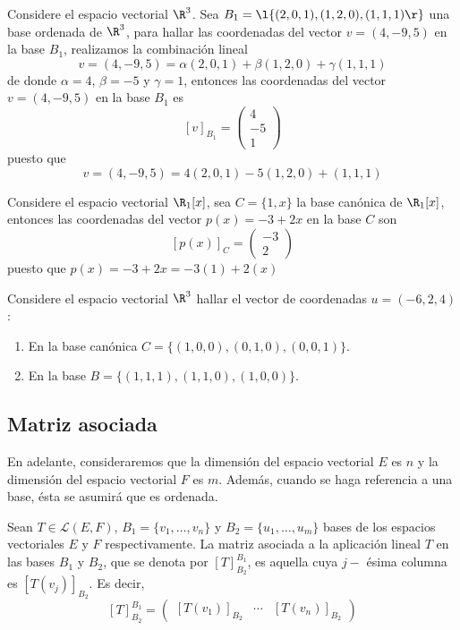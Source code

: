 \documentclass[compacto,10pt]{pubciencias-notas}
\begin{document}
\begin{ejem}\hspace{0pt}
Considere el espacio vectorial $\R^{3}$. Sea $B_{1} = \l\{(2,0,1), (1,2,0), (1,1,1)\r\}$ una base ordenada de $\R^{3}$, para hallar las coordenadas del vector $v=(4,-9,5)$ en la base $B_1$, realizamos la combinaci\'on lineal 
\[
v=(4,-9,5)=\alpha(2,0,1)+\beta(1,2,0)+\gamma(1,1,1)
\]
de donde $\alpha=4$, $\beta=-5$ y $\gamma=1$,
entonces las coordenadas del vector $v = (4,- 9,5)$ en la base $B_{1}$ es
    \[
        [v]_{B_{1}} = \begin{pmatrix}4\\-5\\1\end{pmatrix}
    \]
 puesto que    
\[
v=(4,-9,5)=4(2,0,1)-5(1,2,0)+(1,1,1)
\]
 \end{ejem}
\begin{ejem}
Considere el espacio vectorial $\R_1[x]$, sea $C=\{1,x\}$ la base can\'onica de $\R_1[x]$, entonces las coordenadas del vector $p(x)=-3+2x$ en la base $C$ son
    \[
        [p(x)]_{C} = \begin{pmatrix}-3\\2\end{pmatrix}
    \]
puesto que $p(x)=-3+2x=-3(1)+2(x)$
\end{ejem}

\begin{ejer}
Considere el espacio vectorial $\R^{3}$ hallar el vector de coordenadas $u=(-6,2,4)$:
\begin{enumerate}
    \item En la base can\'onica $C=\{(1,0,0),(0,1,0),(0,0,1)\}$.
    \item  En la base  $B=\{(1,1,1),(1,1,0),(1,0,0)\}$.
\end{enumerate}
\end{ejer}

\setcounter{subsection}{5}
\subsection{Matriz asociada}

En adelante, consideraremos que la dimensión 
del espacio vectorial $E$ es $n$ y la dimensión del espacio vectorial $F$ es $m$. Además, cuando se haga referencia a una base, ésta se asumirá que es ordenada.


\begin{defi}
    Sean $T \in \mathscr{L}(E,F)$, $B_{1} = \{ v_{1}, \ldots, v_{n} \}$ y $B_{2} = \{ u_{1}, \ldots, u_{m} \}$ bases de los espacios vectoriales $E$ y $F$ respectivamente. La matriz asociada a la aplicación lineal $T$ en las bases $B_{1}$ y $B_{2}$, que se denota por $[T]^{B_{1}}_{B_{2}}$, es aquella cuya $j-$ ésima columna es $[T(v_{j})]_{B_{2}}$. Es decir,
    \[
        [T]_{B_{2}}^{B_{1}} =
        \begin{pmatrix}
            [T(v_{1})]_{B_{2}} & \cdots & [T(v_{n})]_{B_{2}}
        \end{pmatrix}
    \]
\end{defi}
\end{document}
